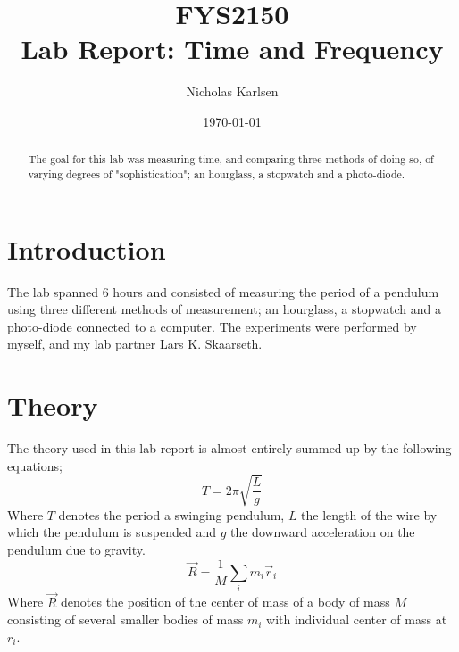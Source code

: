 \documentclass[%
 reprint,
 amsmath,amssymb,
 aps,
]{revtex4-1}
\begin{document}

\title{FYS2150 \\
Lab Report: Time and Frequency}%

\author{Nicholas Karlsen}

\date{\today}%

\begin{abstract}
The goal for this lab was measuring time, and comparing three methods of doing so, of varying degrees of "sophistication"; an hourglass, a stopwatch and a photo-diode.
\end{abstract}

\maketitle


\section{\label{sec:intro}Introduction}
	The lab spanned 6 hours and consisted of measuring the period of a pendulum using three different methods of measurement; an hourglass, a stopwatch and a photo-diode connected to a computer. The experiments were performed by myself, and my lab partner Lars K. Skaarseth.

\section{Theory}
	The theory used in this lab report is almost entirely summed up by the following equations;
	\begin{equation}
        \label{eqn:period}
		T = 2\pi \sqrt{\frac{L}{g}}
	\end{equation}
	Where $T$ denotes the period a swinging pendulum, $L$ the length of the wire by which the pendulum is suspended and $g$ the downward acceleration on the pendulum due to gravity.
	\begin{equation}
		\label{eqn:cm}
		\vec R = \frac{1}{M} \sum_i m_i \vec r_i
	\end{equation}
	Where $\vec R$ denotes the position of the center of mass of a body of mass $M$ consisting of several smaller bodies of mass $m_i$ with individual center of mass at $r_i$.
\end{document}
